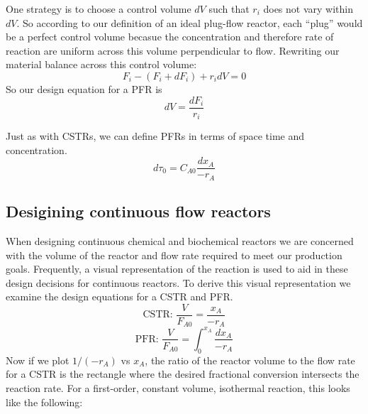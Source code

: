 \documentclass[
]{article}
\begin{document}
One strategy is to choose a control volume \(dV\) such that \(r_i\) does not vary within \(dV\). So according to our definition of an ideal plug-flow reactor, each ``plug'' would be a perfect control volume becasue the concentration and therefore rate of reaction are uniform across this volume perpendicular to flow. Rewriting our material balance across this control volume:
\[F_i - (F_i + dF_i) + r_i dV = 0\]
So our design equation for a PFR is
\[dV = \frac{dF_i}{r_i}\]

Just as with CSTRs, we can define PFRs in terms of space time and concentration.
\[d\tau_0 = C_{A0} \frac{dx_A}{-r_A}\]

\hypertarget{desigining-continuous-flow-reactors}{%
\subsection{Desigining continuous flow reactors}\label{desigining-continuous-flow-reactors}}

When designing continuous chemical and biochemical reactors we are concerned with the volume of the reactor and flow rate required to meet our production goals. Frequently, a visual representation of the reaction is used to aid in these design decisions for continuous reactors. To derive this visual representation we examine the design equations for a CSTR and PFR.
\[\text{CSTR:   }  \frac{V}{F_{A0}} = \frac{x_{A}}{-r_A} \]
\[\text{PFR:   }  \frac{V}{F_{A0}} = \int_0^{x_A}\frac{dx_{A}}{-r_A} \]
Now if we plot \(1/(-r_A)\) vs \(x_A\), the ratio of the reactor volume to the flow rate for a CSTR is the rectangle where the desired fractional conversion intersects the reaction rate. For a first-order, constant volume, isothermal reaction, this looks like the following:
\end{document}
